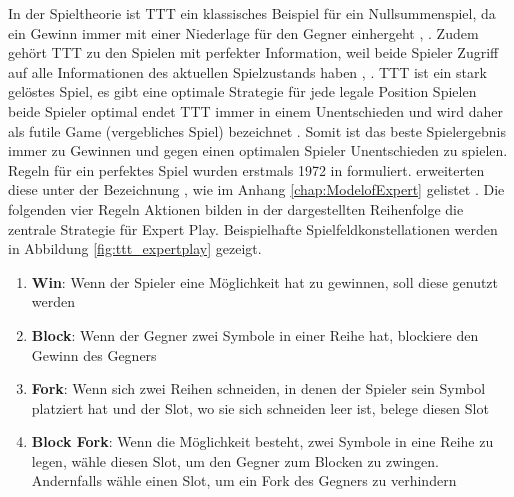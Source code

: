 In der Spieltheorie ist \acs{TTT} ein klassisches Beispiel für ein Nullsummenspiel, da ein Gewinn immer mit einer Niederlage für den Gegner einhergeht \cite[S. 6]{allisSearchingSolutionsGames1994}, \cite[S. 533]{crowleyFlexibleStrategyUse1993}.
Zudem gehört TTT zu den Spielen mit perfekter Information, weil beide Spieler Zugriff auf alle Informationen des aktuellen Spielzustands haben \cite[S. 156]{allisSearchingSolutionsGames1994}, \cite[S. 38]{gardnerm.HexaflexagonsOtherMathematical1988}.
\acs{TTT} ist ein stark gelöstes Spiel, \dahe es gibt eine optimale Strategie für jede legale Position \cite[S. 6]{allisSearchingSolutionsGames1994}
Spielen beide Spieler optimal endet TTT immer in einem Unentschieden und wird daher als futile Game (\dt vergebliches Spiel) bezeichnet \cite[S. 177]{wangPopularLecturesMathematical2014}.
Somit ist das beste Spielergebnis immer zu Gewinnen und gegen einen optimalen Spieler Unentschieden zu spielen. 
Regeln für ein perfektes Spiel wurden erstmals 1972 in \cite{newellHumanProblemSolving1972} formuliert. 
\citeauthor{crowleyFlexibleStrategyUse1993} erweiterten diese unter der Bezeichnung , wie im Anhang \cref{chap:ModelofExpert} gelistet \cite[S. 536]{crowleyFlexibleStrategyUse1993}. 
Die folgenden vier Regeln \bzw Aktionen bilden in der dargestellten Reihenfolge die zentrale Strategie für Expert Play. Beispielhafte Spielfeldkonstellationen werden in Abbildung \cref{fig:ttt_expertplay} gezeigt.

\begin{enumerate}
    \item \textbf{Win}: Wenn der Spieler eine Möglichkeit hat zu gewinnen, soll diese genutzt werden
    \item \textbf{Block}: Wenn der Gegner zwei Symbole in einer Reihe hat, blockiere den Gewinn des Gegners
    \item \textbf{Fork}: Wenn sich zwei Reihen schneiden, in denen der Spieler sein Symbol platziert hat und der Slot, wo sie sich schneiden leer ist, belege diesen Slot
    \item \textbf{Block Fork}: Wenn die Möglichkeit besteht, zwei Symbole in eine Reihe zu legen, wähle diesen Slot, um den Gegner zum Blocken zu zwingen. Andernfalls wähle einen Slot, um ein Fork des Gegners zu verhindern
\end{enumerate}

